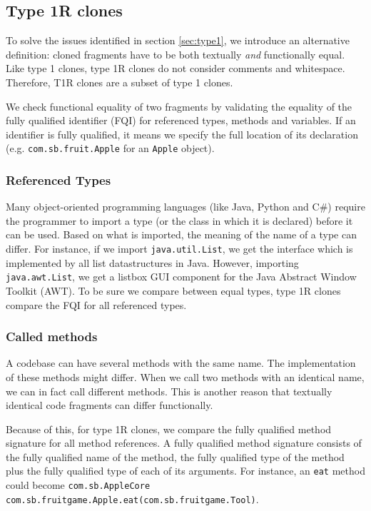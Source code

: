 \subsection{Type 1R clones} \label{sec:type1r}
To solve the issues identified in section \ref{sec:type1}, we introduce an alternative definition: cloned fragments have to be both textually \textit{and} functionally equal. Like type 1 clones, type 1R clones do not consider comments and whitespace. Therefore, T1R clones are a subset of type 1 clones.

We check functional equality of two fragments by validating the equality of the fully qualified identifier (FQI) for referenced types, methods and variables. If an identifier is fully qualified, it means we specify the full location of its declaration (e.g. \texttt{com.sb.fruit.Apple} for an \texttt{Apple} object).

\subsubsection{Referenced Types}
Many object-oriented programming languages (like Java, Python and C\#) require the programmer to import a type (or the class in which it is declared) before it can be used. Based on what is imported, the meaning of the name of a type can differ. For instance, if we import \texttt{java.util.List}, we get the interface which is implemented by all list datastructures in Java. However, importing \texttt{java.awt.List}, we get a listbox GUI component for the Java Abstract Window Toolkit (AWT). To be sure we compare between equal types, type 1R clones compare the FQI for all referenced types.

\subsubsection{Called methods}
A codebase can have several methods with the same name. The implementation of these methods might differ. When we call two methods with an identical name, we can in fact call different methods. This is another reason that textually identical code fragments can differ functionally.

Because of this, for type 1R clones, we compare the fully qualified method signature for all method references. A fully qualified method signature consists of the fully qualified name of the method, the fully qualified type of the method plus the fully qualified type of each of its arguments. For instance, an \texttt{eat} method could become \texttt{com.sb.AppleCore com.sb.fruitgame.Apple.eat(com.sb.fruitgame.Tool)}.


